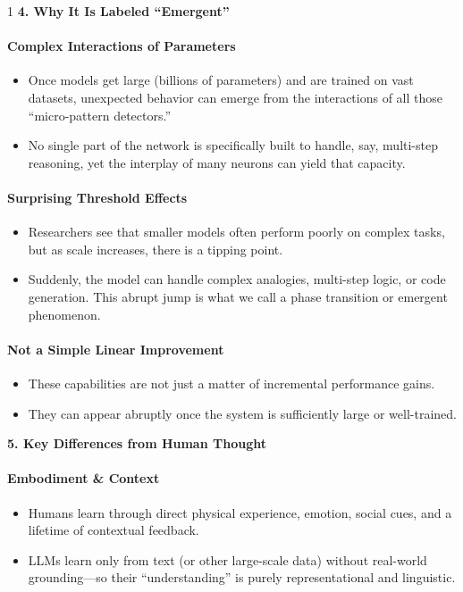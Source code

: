 {\begin{spacing}{1}
\noindent \textbf{4. Why It Is Labeled ``Emergent''}

\paragraph{Complex Interactions of Parameters}
\begin{itemize}
    \item Once models get large (billions of parameters) and are trained on vast datasets, unexpected behavior can emerge from the interactions of all those ``micro-pattern detectors.''
    \item No single part of the network is specifically built to handle, say, multi-step reasoning, yet the interplay of many neurons can yield that capacity.
\end{itemize}

\paragraph{Surprising Threshold Effects}
\begin{itemize}
    \item Researchers see that smaller models often perform poorly on complex tasks, but as scale increases, there is a tipping point.
    \item Suddenly, the model can handle complex analogies, multi-step logic, or code generation. This abrupt jump is what we call a phase transition or emergent phenomenon.
\end{itemize}

\paragraph{Not a Simple Linear Improvement}
\begin{itemize}
    \item These capabilities are not just a matter of incremental performance gains.
    \item They can appear abruptly once the system is sufficiently large or well-trained.
\end{itemize}

\noindent \textbf{5. Key Differences from Human Thought}

\paragraph{Embodiment \& Context}
\begin{itemize}
    \item Humans learn through direct physical experience, emotion, social cues, and a lifetime of contextual feedback.
    \item LLMs learn only from text (or other large-scale data) without real-world grounding---so their ``understanding'' is purely representational and linguistic.
\end{itemize}


\end{spacing}}
